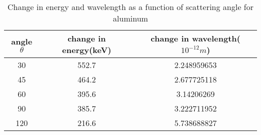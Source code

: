 \begin{table}
    \centering
    \begin{tabular}{|c|c|c|}
        \hline
        angle $\theta$ & change in energy(keV) & change in wavelength($10^{-12}m$) \\ \hline
        30             & 552.7                 & 2.248959653                       \\ \hline
        45             & 464.2                 & 2.677725118                       \\ \hline
        60             & 395.6                 & 3.14206269                        \\ \hline
        90             & 385.7                 & 3.222711952                       \\ \hline
        120            & 216.6                 & 5.738688827                       \\ \hline
    \end{tabular}
    \caption{Change in energy and wavelength as a function of scattering angle for aluminum}
    \label{tab:1}
\end{table}